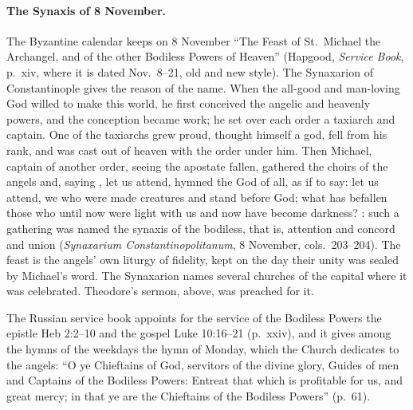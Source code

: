 \paragraph{The Synaxis of 8 November.} The Byzantine calendar keeps on 8
November ``The Feast of St.\ Michael the Archangel, and of the other
Bodiless Powers of Heaven'' (Hapgood, \emph{Service Book}, p.~xiv, where it
is dated Nov.\ 8--21, old and new style). The Synaxarion of Constantinople
gives the reason of the name. When the all-good and man-loving God willed to
make this world, he first conceived the angelic and heavenly powers, and
the conception became work; he set over each order a taxiarch and captain.
One of the taxiarchs grew proud, thought himself a god, fell from his rank,
and was cast out of heaven with the order under him. Then Michael, captain
of another order, seeing the apostate fallen, gathered the choirs of the
angels and, saying , let us attend, hymned the God of
all, as if to say: let us attend, we who were made creatures and stand
before God; what has befallen those who until now were light with us and
now have become darkness? : such a gathering was named the synaxis of the bodiless, that is,
attention and concord and union (\emph{Synaxarium Constantinopolitanum}, 8
November, cols.\ 203--204). The feast is the angels' own liturgy of
fidelity, kept on the day their unity was sealed by Michael's word. The
Synaxarion names several churches of the capital where it was celebrated.
Theodore's sermon, above, was preached for it.

The Russian service book appoints for the service of the Bodiless Powers
the epistle Heb 2:2--10 and the gospel Luke 10:16--21 (p.~xxiv), and it
gives among the hymns of the weekdays the hymn of Monday, which the Church
dedicates to the angels: ``O ye Chieftains of God, servitors of the divine
glory, Guides of men and Captains of the Bodiless Powers: Entreat that which
is profitable for us, and great mercy; in that ye are the Chieftains of the
Bodiless Powers'' (p.~61).

